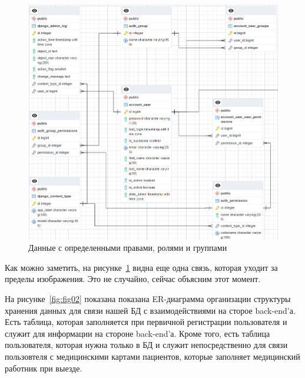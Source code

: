 \begin{figure}
  \includegraphics[scale=0.735]{inc/django}
  \caption{Данные с определенными правами, ролями и группами}
  \label{fig:fig01}
\end{figure}

Как можно заметить, на рисунке~\ref{fig:fig01} видна еще одна связь, которая уходит за пределы изображения. Это не случайно, сейчас объясним этот момент.

На рисунке~\ref{fig:fig02} показана показана ER-диаграмма организации структуры хранения данных для связи нашей БД с взаимодействиями на сторое back-end'а. Есть таблица, которая заполняется при первичной регистрации пользователя и служит для информации на стороне back-end'а. Кроме того, есть таблица пользователя, которая нужна только в БД и служит непосредственно для связи пользовтеля с медицинскими картами пациентов, которые заполняет медицинский работник при выезде.

